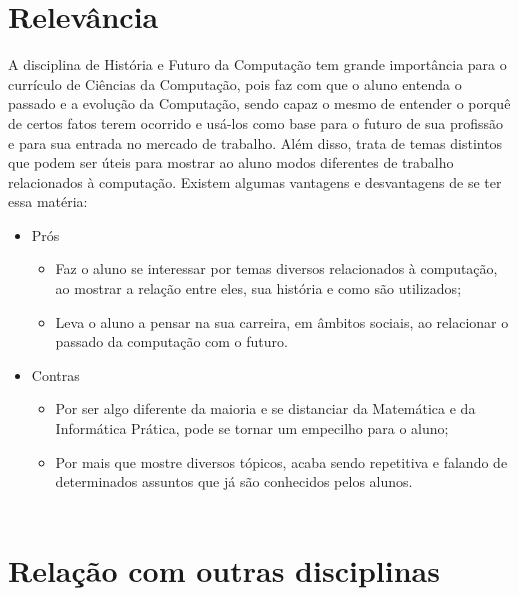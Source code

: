 \documentclass[a4paper]{article}
\begin{document}
\section{Relevância}
	A disciplina de História e Futuro da Computação tem grande importância para o currículo de Ciências da Computação, pois faz com que o aluno entenda o passado e a evolução da Computação, sendo capaz o mesmo de entender o porquê de certos fatos terem ocorrido e usá-los como base para o futuro de sua profissão e para sua entrada no mercado de trabalho. Além disso, trata de temas distintos que podem ser úteis para mostrar ao aluno modos diferentes de trabalho relacionados à computação. Existem algumas vantagens e desvantagens de se ter essa matéria: 

\begin{itemize}
\item Prós
\begin{itemize}
\item Faz o aluno se interessar por temas diversos relacionados à computação, ao mostrar a relação entre eles, sua história e como são utilizados;
\item Leva o aluno a pensar na sua carreira, em âmbitos sociais, ao relacionar o passado da computação com o futuro.
\end{itemize}
\item Contras
\begin{itemize}
\item Por ser algo diferente da maioria e se distanciar da Matemática e da Informática Prática, pode se tornar um empecilho para o aluno;
\item Por mais que mostre diversos tópicos, acaba sendo repetitiva e falando de determinados assuntos que já são conhecidos pelos alunos.
\\
\\
\end{itemize}
\end{itemize}

\section{Relação com outras disciplinas}
\end{document}
